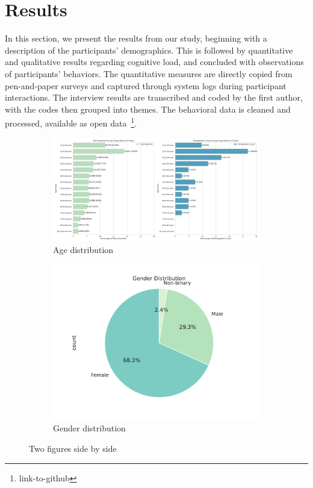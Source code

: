 \section{Results}
\label{sec:result}
In this section, we present the results from our study, beginning with a description of the participants' demographics. This is followed by quantitative and qualitative results regarding cognitive load, and concluded with observations of participants' behaviors. The quantitative measures are directly copied from pen-and-paper surveys and captured through system logs during participant interactions. The interview results are transcribed and coded by the first author, with the codes then grouped into themes. The behavioral data is cleaned and processed, available as open data~\footnote{link-to-github}.

\begin{figure}[h]
    \centering
    \begin{subfigure}[b]{0.65\textwidth}
        \centering
        \includegraphics[width=\textwidth]{content/image/demo/demo_age_group.pdf}
        \caption{Age distribution}
        \label{fig:demoAge}
    \end{subfigure}
    \hfill
    \begin{subfigure}[b]{0.3\textwidth}
        \centering
        \includegraphics[width=\textwidth]{content/image/demo/demo_gender.pdf}
        \caption{Gender distribution}
        \label{fig:demoGender}
    \end{subfigure}
    \caption{Two figures side by side}
    \label{fig:Demographics}
\end{figure}

